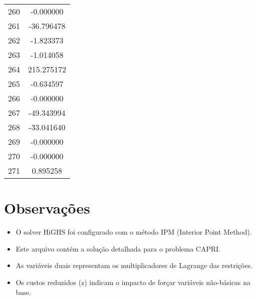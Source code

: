 \documentclass[12pt]{article}
\begin{document}
\begin{longtable}{@{}cc@{}}
260 & -0.000000 \\
261 & -36.796478 \\
262 & -1.823373 \\
263 & -1.014058 \\
264 & 215.275172 \\
265 & -0.634597 \\
266 & -0.000000 \\
267 & -49.343994 \\
268 & -33.041640 \\
269 & -0.000000 \\
270 & -0.000000 \\
271 & 0.895258 \\

\end{longtable}


\section{Observações}

\begin{itemize}
\item O solver HiGHS foi configurado com o método IPM (Interior Point Method).
\item Este arquivo contém a solução detalhada para o problema CAPRI.
\item As variáveis duais representam os multiplicadores de Lagrange das restrições.
\item Os custos reduzidos (z) indicam o impacto de forçar variáveis não-básicas na base.
\end{itemize}
\end{document}
